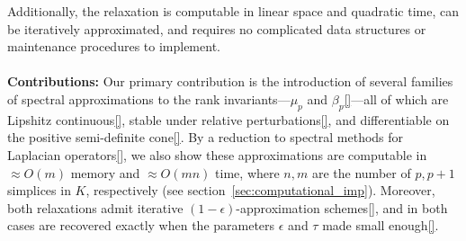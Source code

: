 \documentclass[10pt]{article}
\numberwithin{equation}{section}
\newcommand{\+}{%
	\raisebox{0.18ex}{\scaleobj{0.55}{+}}
}
\theoremstyle{definition}
\theoremstyle{definition}
\begin{document}
Additionally, the relaxation is computable in linear space and quadratic time, can be iteratively approximated, and requires no complicated data structures or maintenance procedures to implement. 
\\
\\
\noindent 
\textbf{Contributions:} Our primary contribution is the introduction of several families of spectral approximations to the rank invariants---$\mu_p$ and $\beta_p$\ref{}---all of which are Lipshitz continuous\ref{}, stable under relative perturbations\ref{}, and differentiable on the positive semi-definite cone\ref{}. By a reduction to spectral methods for Laplacian operators\ref{}, we also show these approximations are computable in $\approx O(m)$ memory and $\approx O(mn)$ time, where $n,m$ are the number of $p, p+1$ simplices in $K$, respectively (see section~\ref{sec:computational_imp}). 
Moreover, both relaxations admit iterative $(1-\epsilon)$-approximation schemes\ref{}, and in both cases are recovered exactly when the parameters $\epsilon$ and $\tau$ made small enough\ref{}. 
\end{document}
